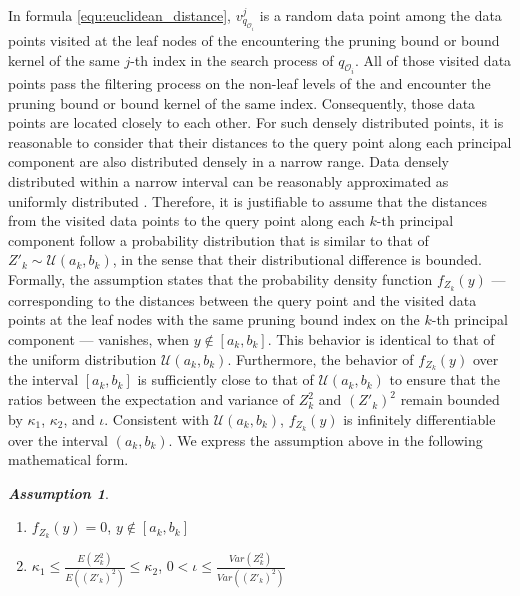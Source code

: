 In formula \ref{equ:euclidean_distance}, $v^{j}_{q_{\mathcal{O}_i}}$ is a random data point among the data points visited at the leaf nodes of the \dualtree encountering the pruning bound or bound kernel of the same $j$-th index in the search process of $q_{\mathcal{O}_i}$. All of those visited data points pass the filtering process on the non-leaf levels of the \dualtree and encounter the pruning bound or bound kernel of the same index. Consequently, those data points are located closely to each other. For such densely distributed points, it is reasonable to consider that their distances to the query point along each principal component are also distributed densely in a narrow range. Data densely distributed within a narrow interval can be reasonably approximated as uniformly distributed \cite{gning2010mixture, reiss1981uniform, chasani2022uu}. Therefore, it is justifiable to assume that the distances from the visited data points to the query point along each $k$-th principal component follow a probability distribution that is similar to that of $Z'_k \sim \mathcal{U}(a_k, b_k)$, in the sense that their distributional difference is bounded. Formally, the assumption states that the probability density function $f_{Z_k}(y)$ — corresponding to the distances between the query point and the visited data points at the leaf nodes with the same pruning bound index on the \(k\)-th principal component — vanishes, when $y\notin [a_k, b_k]$. This behavior is identical to that of the uniform distribution $\mathcal{U}(a_k, b_k)$. Furthermore, the behavior of $f_{Z_k}(y)$ over the interval $[a_k, b_k]$ is sufficiently close to that of $\mathcal{U}(a_k, b_k)$ to ensure that the ratios between the expectation and variance of $Z_k^2$ and $(Z'_k)^2$ remain bounded by $\kappa_1$, $\kappa_2$, and $\iota$. Consistent with $\mathcal{U}(a_k,b_k)$, $f_{Z_k}(y)$ is infinitely differentiable over the interval $(a_k,b_k)$. We express the assumption above in the following mathematical form.

\noindent \textbf{\textit{Assumption 1}}.
\begin{enumerate}
    \item
$f_{Z_k}(y)=0$, $y\notin[a_k,b_k]$  
    \item 
$\kappa_1 \leq \frac{E(Z^2_k)}{E((Z'_k)^2)}\leq \kappa_2$,  $0<\iota\leq \frac{Var(Z^2_k)}{Var((Z'_k)^2)}$ 
\end{enumerate}

